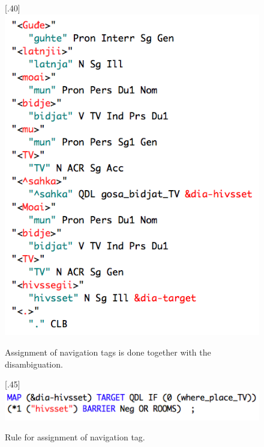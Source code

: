 \documentclass[11pt]{article}
\begin{document}
\begin{figure}[htbp]
\begin{center}
\scalebox{.40}[.40]{\includegraphics{presentation/img/hivssegiiCGanal.png}}\\
\caption{Assignment of navigation tags is done together with the disambiguation.}
\label{hivssetanalysis}
\end{center}
\end{figure}

\begin{figure}[htbp]
\begin{center}
\scalebox{.45}[.45]{\includegraphics{presentation/img/hivssetrule.png}}\\
\caption{Rule for assignment of navigation tag.}
\label{hivssettag}
\end{center}
\end{figure}
\end{document}
